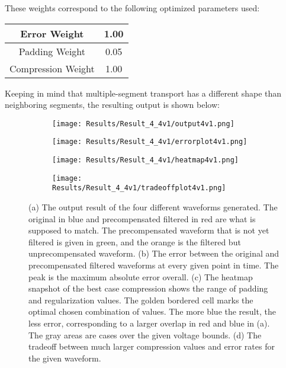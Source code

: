 \documentclass[11pt, a4paper]{article}
\theoremstyle{definition}
\numberwithin{equation}{section}
\begin{document}
These weights correspond to the following optimized parameters used:

\begin{center}
\begin{tabular}{ | c | c | } 
  \hline
   Error Weight & 1.00 \\ 
  \hline
  Padding Weight & 0.05 \\ 
  \hline
  Compression Weight & 1.00 \\ 
  \hline
\end{tabular}
\end{center}

Keeping in mind that multiple-segment transport has a different shape than neighboring segments, the resulting output is shown below:

\begin{figure}[hbt!]
\centering
\begin{subfigure}{.45\linewidth}
  \centering
  \texttt{[image: Results/Result\_4\_4v1/output4v1.png]}
  \subcaption{}
  \label{output4v1}
\end{subfigure}
\quad
\begin{subfigure}{.45\linewidth}
  \centering
  \texttt{[image: Results/Result\_4\_4v1/errorplot4v1.png]}
  \subcaption{}
  \label{errorplot4v1}
\end{subfigure}
\begin{subfigure}{.45\linewidth}
  \centering
  \texttt{[image: Results/Result\_4\_4v1/heatmap4v1.png]}
  \subcaption{}
  \label{heatmap4v1}
\end{subfigure}
\quad
\begin{subfigure}{.45\linewidth}
  \centering
  \texttt{[image: Results/Result\_4\_4v1/tradeoffplot4v1.png]}
  \caption{}
  \label{tradeoffplot4v1}
\end{subfigure}
\caption{(a) The output result of the four different waveforms generated. The original in blue and precompensated filtered in red are what is supposed to match. The precompensated waveform that is not yet filtered is given in green, and the orange is the filtered but unprecompensated waveform. (b) The error between the original and precompensated filtered waveforms at every given point in time. The peak is the maximum absolute error overall. (c) The heatmap snapshot of the best case compression shows the range of padding and regularization values. The golden bordered cell marks the optimal chosen combination of values. The more blue the result, the less error, corresponding to a larger overlap in red and blue in (a). The gray areas are cases over the given voltage bounds. (d) The tradeoff between much larger compression values and error rates for the given waveform.}
\label{fig:3v1}
\end{figure}
\end{document}
